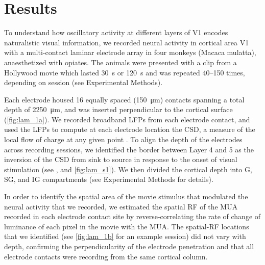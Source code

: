 \section{Results}

To understand how oscillatory activity at different layers of \acf{V1} encodes naturalistic visual information, we recorded neural activity in cortical area \acs{V1} with a multi-contact laminar electrode array in four monkeys (Macaca mulatta), anaesthetized with opiates.
The animals were presented with a clip from a Hollywood movie which lasted \SI{30}{\second} or \SI{120}{\second} and was repeated \numrange{40}{150} times, depending on session (see Experimental Methods).

Each electrode housed \num{16} equally spaced (\SI{150}{\micro\metre}) contacts spanning a total depth of \SI{2250}{\micro\metre}, and was inserted perpendicular to the cortical surface (\autoref{fig:lam_1a}).
We recorded broadband \acp{LFP} from each electrode contact, and used the \acp{LFP} to compute at each electrode location the \ac{CSD}, a measure of the local flow of charge at any given point \citep{Einevoll2013}.
To align the depth of the electrodes across recording sessions, we identified the border between Layer 4 and 5 as the inversion of the \ac{CSD} from sink to source in response to the onset of visual stimulation (see \citealp{Schroeder1991}, and \autoref{fig:lam_s1}).
We then divided the cortical depth into \acf{G}, \acf{SG}, and \acf{IG} compartments (see Experimental Methods for details).

In order to identify the spatial area of the movie stimulus that modulated the neural activity that we recorded, we estimated the spatial \ac{RF} of the \ac{MUA} recorded in each electrode contact site by reverse-correlating the rate of change of luminance of each pixel in the movie with the \ac{MUA}.
The spatial-\ac{RF} locations that we identified (see \autoref{fig:lam_1b} for an example session) did not vary with depth, confirming the perpendicularity of the electrode penetration and that all electrode contacts were recording from the same cortical column.


